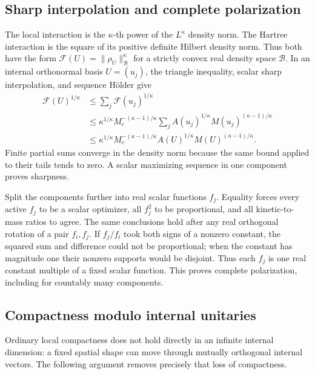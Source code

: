 \subsection{Sharp interpolation and complete polarization}
The local interaction is the $\kappa$-th power of the $L^\kappa$
density norm. The Hartree interaction is the square of its positive
definite Hilbert density norm. Thus both have the form
$\mathcal F(U)=\|\rho_U\|_{\mathcal B}^\kappa$ for a strictly convex
real density space $\mathcal B$.
In an internal orthonormal basis $U=(u_j)$, the triangle inequality,
scalar sharp interpolation, and sequence H\"older give
\begin{align*}
 \mathcal F(U)^{1/\kappa}
 &\le\sum_j\mathcal F(u_j)^{1/\kappa}\\
 &\le\kappa^{1/\kappa}M_c^{-(\kappa-1)/\kappa}
   \sum_j A(u_j)^{1/\kappa}M(u_j)^{(\kappa-1)/\kappa}\\
 &\le\kappa^{1/\kappa}M_c^{-(\kappa-1)/\kappa}
              A(U)^{1/\kappa}M(U)^{(\kappa-1)/\kappa}.
\end{align*}
Finite partial sums converge in the density norm because the same
bound applied to their tails tends to zero. A scalar maximizing sequence
in one component proves sharpness.

Split the components further into real scalar functions $f_j$.
Equality forces every active $f_j$ to be a scalar optimizer, all
$f_j^2$ to be proportional, and all kinetic-to-mass ratios to agree.
The same conclusions hold after any real orthogonal rotation of a
pair $f_i,f_j$. If $f_j/f_i$ took both signs of a nonzero constant,
the squared sum and difference could not be proportional; when the
constant has magnitude one their nonzero supports would be disjoint.
Thus each $f_j$ is one real constant multiple of a fixed scalar
function. This proves complete polarization, including for countably
many components.

\subsection{Compactness modulo internal unitaries}
Ordinary local compactness does not hold directly in an infinite
internal dimension: a fixed spatial shape can move through mutually
orthogonal internal vectors. The following argument removes precisely
that loss of compactness.

